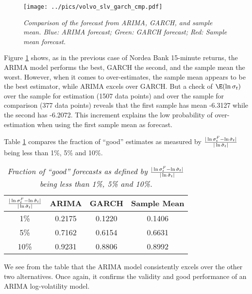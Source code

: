 \begin{figure}[htb!]
  \centering
    \texttt{[image: ../pics/volvo\_slv\_garch\_cmp.pdf]}
    \label{fig:volvo_slv_garch_cmp}
  \caption{\small \it Comparison of the forecast from ARIMA, GARCH,
    and sample mean. Blue: ARIMA forecast; Green: GARCH forecast; Red:
    Sample mean forecast.}
\end{figure}
Figure \ref{fig:volvo_slv_garch_cmp} shows, as in the previous case of
Nordea Bank 15-minute returns, the ARIMA model performs the best, GARCH
the second, and the sample mean the worst. However, when it comes to
over-estimates, the sample mean appears to be the best estimator,
while ARIMA excels over GARCH. But a check of $\E(\ln\sigma_t)$ over
the sample for estimation (1507 data points) and over the sample for
comparison (377 data points) reveals that the first sample has mean
-6.3127 while the second has -6.2072. This increment explains the low
probability of over-estimation when using the first sample mean as
forecast. 

Table \ref{tab:volvo_good_percentage} compares the fraction of
``good'' estimates as measured by ${|\ln\sigma^F_t -
  \ln\hat{\sigma}_t| \over |\ln \hat{\sigma}_t|}$ being less than 1\%,
5\% and 10\%.
\begin{table}[htb!]
  \centering
  \begin{tabular}{|c|c|c|c|}
    \hline
    ${|\ln \sigma^F_t - \ln \hat{\sigma}_t| \over |\ln
      \hat{\sigma}_t|}$ &
    ARIMA & GARCH & Sample Mean \\
    \hline
    1\% & 0.2175 & 0.1220 & 0.1406 \\
    \hline
    5\% & 0.7162 & 0.6154 & 0.6631 \\
    \hline
    10\% & 0.9231 & 0.8806 & 0.8992 \\
    \hline
  \end{tabular}
  \caption{\small \it Fraction of ``good'' forecasts as defined by
    ${|\ln \sigma^F_t - \ln \hat{\sigma}_t| \over |\ln
      \hat{\sigma}_t|}$ being less than 1\%, 5\% and 10\%.}
  \label{tab:volvo_good_percentage}
\end{table}
We see from the table that the ARIMA model consistently excels over
the other two alternatives. Once again, it confirms the validity and
good performance of an ARIMA log-volatility model.

